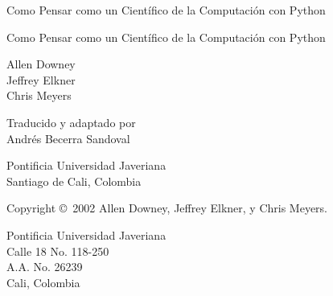 \documentclass[letter,10pt]{book}
\newcommand{\clearemptydoublepage}{\newpage{\pagestyle{empty}\cleardoublepage}}
\begin{document}
\frontmatter

\thispagestyle{empty}

\begin{flushright}
\vspace*{2.5in}
{\huge Como Pensar como un Científico de la Computación}
\vspace{0.25in}
{\LARGE con Python}
\vfill
\end{flushright}

\clearemptydoublepage

\pagebreak
\thispagestyle{empty}

\begin{flushright}
\vspace*{2.5in}
{\huge Como Pensar como un Científico de la Computación}
\vspace{0.25in}
{\LARGE con Python}
\vspace{0.5in}
\author{Allen Downey, Jeffrey Elkner y Chris Meyers}

{\small
Allen Downey\\
Jeffrey Elkner\\
Chris Meyers\\
}

\vspace{.25in}

{\small
Traducido y adaptado por\\
Andrés Becerra Sandoval \\
}

\vspace{0.5in}
{\Large Pontificia Universidad Javeriana} \\
{\small Santiago de Cali, Colombia}
\vfill
\end{flushright}


\pagebreak
\thispagestyle{empty}
Copyright \copyright ~2002 Allen Downey, Jeffrey Elkner, y Chris Meyers.
\vspace{0.25in}

\vspace{0.25in}

\begin{flushleft}
Pontificia Universidad Javeriana \\
Calle 18 No. 118-250 \\
A.A. No.  26239 \\
Cali, Colombia \\
\end{flushleft}
\end{document}
